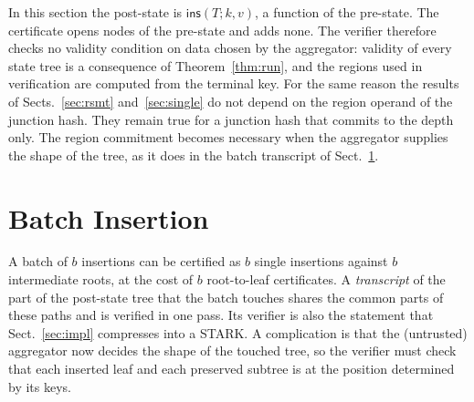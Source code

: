 \documentclass[runningheads]{llncs}
\newcommand{\ins}{\mathsf{ins}}
\begin{document}
\begin{remark}\label{rem:derived}
In this section the post-state is $\ins(T;k,v)$, a function of the pre-state. The certificate opens nodes of the pre-state and adds none. The verifier therefore checks no validity condition on data chosen by the aggregator: validity of every state tree is a consequence of Theorem~\ref{thm:run}, and the regions used in verification are computed from the terminal key. For the same reason the results of Sects.~\ref{sec:rsmt} and~\ref{sec:single} do not depend on the region operand of the junction hash. They remain true for a junction hash that commits to the depth only. The region commitment becomes necessary when the aggregator supplies the shape of the tree, as it does in the batch transcript of Sect.~\ref{sec:batch}.
\end{remark}

\section{Batch Insertion}\label{sec:batch}

A batch of $b$ insertions can be certified as $b$ single insertions against $b$ intermediate roots, at the cost of $b$ root-to-leaf certificates. A \emph{transcript} of the part of the post-state tree that the batch touches shares the common parts of these paths and is verified in one pass. Its verifier is also the statement that Sect.~\ref{sec:impl} compresses into a STARK. A complication is that the (untrusted) aggregator now decides the shape of the touched tree, so the verifier must check that each inserted leaf and each preserved subtree is at the position determined by its keys.
\end{document}
